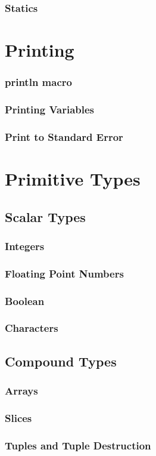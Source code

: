 \documentclass{beamer}
\begin{document}
\begin{frame}
  \frametitle{Statics}
\end{frame}

\section{Printing}
\begin{frame}
  \frametitle{println macro}
\end{frame}

\begin{frame}
  \frametitle{Printing Variables}
\end{frame}

\begin{frame}
  \frametitle{Print to Standard Error}
\end{frame}

\section{Primitive Types}
\subsection{Scalar Types}
\begin{frame}
  \frametitle{Integers}
\end{frame}

\begin{frame}
  \frametitle{Floating Point Numbers}
\end{frame}

\begin{frame}
  \frametitle{Boolean}
\end{frame}

\begin{frame}
  \frametitle{Characters}
\end{frame}

\subsection{Compound Types}
\begin{frame}
  \frametitle{Arrays}
\end{frame}

\begin{frame}
  \frametitle{Slices}
\end{frame}

\begin{frame}
  \frametitle{Tuples and Tuple Destruction}
\end{frame}
\end{document}
